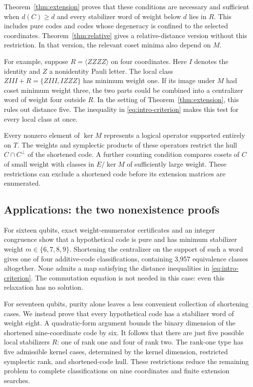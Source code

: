 Theorem~\ref{thm:extension} proves that these conditions are necessary
and sufficient when \(d(C)\geq d\) and every stabilizer word of weight
below \(d\) lies in \(R\). This includes pure codes and codes whose
degeneracy is confined to the selected coordinates.
Theorem~\ref{thm:relative} gives a relative-distance version without
this restriction. In that version, the relevant coset minima also depend
on \(M\).

For example, suppose \(R=\langle ZZZZ\rangle\) on four coordinates.
Here \(I\) denotes the identity and \(Z\) a nonidentity Pauli letter.
The local class \(ZIII+R=\{ZIII,IZZZ\}\) has minimum weight one.
If its image under \(M\) had coset minimum weight three, the two
parts could be combined into a centralizer word of weight four outside
\(R\). In the setting of Theorem~\ref{thm:extension}, this rules out
distance five. The inequality in \eqref{eq:intro-criterion} makes this
test for every local class at once.

Every nonzero element of \(\ker M\) represents a logical operator
supported entirely on \(T\). The weights and symplectic products of these operators restrict the hull
\(C\cap C^\perp\) of the shortened code. A further counting condition
compares cosets of \(C\) of small weight with classes in \(E/\ker M\)
of sufficiently large weight. These restrictions can exclude a shortened
code before its extension matrices are enumerated.

\subsection{Applications: the two nonexistence proofs}

For sixteen qubits, exact weight-enumerator certificates and an integer
congruence show that a hypothetical code is pure and has minimum
stabilizer weight \(m\in\{6,7,8,9\}\). Shortening the centralizer on
the support of such a word gives one of four additive-code classifications,
containing 3,957 equivalence classes altogether. None admits a map
satisfying the distance inequalities in \eqref{eq:intro-criterion}.
The commutation equation is not needed in this case: even this relaxation
has no solution.

For seventeen qubits, purity alone leaves a less convenient collection
of shortening cases. We instead prove that every hypothetical code has
a stabilizer word of weight eight. A quadratic-form argument bounds the
binary dimension of the shortened nine-coordinate code by six. It follows
that there are just five possible local stabilizers \(R\): one of rank
one and four of rank two. The rank-one type has five admissible kernel cases,
determined by the kernel dimension, restricted symplectic rank, and
shortened-code hull.
These restrictions reduce the remaining problem to complete classifications
on nine coordinates and finite extension searches.

